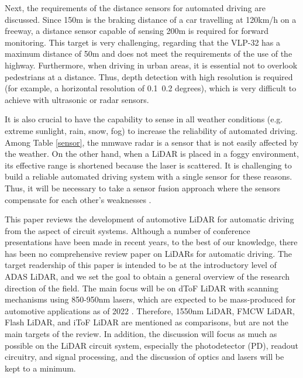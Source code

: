 \documentclass[paper]{ieice}
\begin{document}
Next, the requirements of the distance sensors for automated driving are discussed. Since 150m is the braking distance of a car travelling at 120km/h on a freeway, a distance sensor capable of sensing 200m is required for forward monitoring. This target is very challenging, regarding that the VLP-32\cite {velodyne} has a maximum distance of 50m and does not meet the requirements of the use of the highway. Furthermore, when driving in urban areas, it is essential not to overlook pedestrians at a distance. Thus, depth detection with high resolution is required (for example, a horizontal resolution of 0.1~0.2 degrees), which is very difficult to achieve with ultrasonic or radar sensors\cite{mitomo201077,lee2010fully}.

It is also crucial to have the capability to sense in all weather conditions (e.g. extreme sunlight, rain, snow, fog) to increase the reliability of automated driving. Among Table \ref{sensor}, the mmwave radar is a sensor that is not easily affected by the weather. On the other hand, when a LiDAR is placed in a foggy environment, its effective range is shortened because the laser is scattered. 
It is challenging to build a reliable automated driving system with a single sensor for these reasons. Thus, it will be necessary to take a sensor fusion approach where the sensors compensate for each other's weaknesses \cite{yeong2021sensor, loufusion}.

This paper reviews the development of automotive LiDAR for automatic driving from the aspect of circuit systems. Although a number of conference presentations have been made in recent years, to the best of our knowledge, there has been no comprehensive review paper on LiDARs for automatic driving.
The target readership of this paper is intended to be at the introductory level of ADAS LiDAR, and we set the goal to obtain a general overview of the research direction of the field. The main focus will be on dToF LiDAR with scanning mechanisms using 850-950nm lasers, which are expected to be mass-produced for automotive applications as of 2022 \cite{niclass2012100, niclass2008128, niclass20130, yoshioka201820, yoshioka201820ch, kondo2020automotive, ta20202d, akita2017imager, ito2013system, liu201960, kumagai2021189x600, ito2020back, seo2021direct, ouster}. 
Therefore, 1550nm LiDAR\cite{chung202119}, FMCW LiDAR\cite{behroozpour201611, poulton2017coherent}, Flash LiDAR\cite{ximenes2018256, padmanabhan20217, lindner2018252}, and iToF LiDAR\cite{kawahito2007cmos, bamji20140, bamji2018impixel, keel2019vga} are mentioned as comparisons, but are not the main targets of the review. In addition, the discussion will focus as much as possible on the LiDAR circuit system, especially the photodetector (PD), readout circuitry, and signal processing, and the discussion of optics and lasers will be kept to a minimum.
\end{document}
